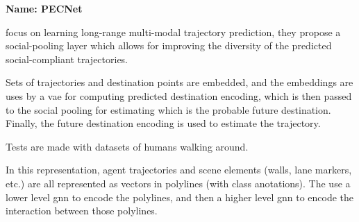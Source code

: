 
\textbf{Name: PECNet}

\cite{mangalam2020not} focus on learning long-range multi-modal trajectory prediction, they propose a social-pooling layer which allows for improving the diversity of the predicted social-compliant trajectories.

Sets of trajectories and destination points are embedded, and the embeddings are uses by a \gls{vae} for computing predicted destination encoding, which is then passed to the social pooling for estimating which is the probable future destination.
%
Finally, the future destination encoding is used to estimate the trajectory.
%

Tests are made with datasets of humans walking around.


\cite{gao2020vectornet} In this representation, agent trajectories and scene elements (walls, lane markers, etc.) are all represented as vectors in polylines (with class anotations). The use a lower level gnn to encode the polylines, and then a higher level gnn to encode the interaction between those polylines. 



\cite{tsai2020generative}


\cite{cui2021learning}


\cite{kiss2021probabilistic}


\cite{xu2021tra2tra}


\cite{kothari2021human}


